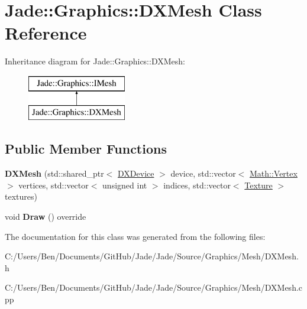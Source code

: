 \hypertarget{class_jade_1_1_graphics_1_1_d_x_mesh}{}\section{Jade\+:\+:Graphics\+:\+:D\+X\+Mesh Class Reference}
\label{class_jade_1_1_graphics_1_1_d_x_mesh}
Inheritance diagram for Jade\+:\+:Graphics\+:\+:D\+X\+Mesh\+:\begin{figure}[H]
\begin{center}
\leavevmode
\includegraphics[height=2.000000cm]{class_jade_1_1_graphics_1_1_d_x_mesh}
\end{center}
\end{figure}
\subsection*{Public Member Functions}
\begin{DoxyCompactItemize}
\item 
\hypertarget{class_jade_1_1_graphics_1_1_d_x_mesh_aec91542183ff094e2fc4f0c071dd1f15}{}{\bfseries D\+X\+Mesh} (std\+::shared\+\_\+ptr$<$ \hyperlink{class_jade_1_1_graphics_1_1_d_x_device}{D\+X\+Device} $>$ device, std\+::vector$<$ \hyperlink{struct_jade_1_1_math_1_1_vertex}{Math\+::\+Vertex} $>$ vertices, std\+::vector$<$ unsigned int $>$ indices, std\+::vector$<$ \hyperlink{class_jade_1_1_graphics_1_1_texture}{Texture} $>$ textures)\label{class_jade_1_1_graphics_1_1_d_x_mesh_aec91542183ff094e2fc4f0c071dd1f15}

\item 
\hypertarget{class_jade_1_1_graphics_1_1_d_x_mesh_a61dc93ef90c912c08cb5b7aaf33d234c}{}void {\bfseries Draw} () override\label{class_jade_1_1_graphics_1_1_d_x_mesh_a61dc93ef90c912c08cb5b7aaf33d234c}

\end{DoxyCompactItemize}


The documentation for this class was generated from the following files\+:\begin{DoxyCompactItemize}
\item 
C\+:/\+Users/\+Ben/\+Documents/\+Git\+Hub/\+Jade/\+Jade/\+Source/\+Graphics/\+Mesh/D\+X\+Mesh.\+h\item 
C\+:/\+Users/\+Ben/\+Documents/\+Git\+Hub/\+Jade/\+Jade/\+Source/\+Graphics/\+Mesh/D\+X\+Mesh.\+cpp\end{DoxyCompactItemize}
